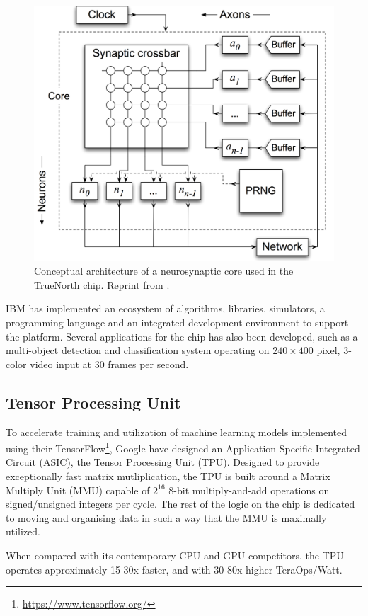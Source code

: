 \begin{figure}[ht]
  \centering
  \includegraphics[width=0.6\linewidth]{fig/truenorth-arch}
  \caption[TrueNorth neurosynaptic core architecture]{Conceptual architecture of a neurosynaptic core used in the TrueNorth
  chip. Reprint from \cite{Preissl2012}.}
  \label{fig:truenorth-arch}
\end{figure}

IBM has implemented an ecosystem of algorithms, libraries, simulators, a
programming language and an integrated development environment to support the
platform. Several applications for the chip has also been developed, such as a
multi-object detection and classification system operating on $240\times400$
pixel, 3-color video input at 30 frames per second.

\subsection{Tensor Processing Unit}

To accelerate training and utilization of machine learning models implemented
using their TensorFlow\footnote{\url{https://www.tensorflow.org/}}, Google have
designed an Application Specific Integrated Circuit (ASIC), the Tensor
Processing Unit (TPU)\cite{Jouppi2017}. Designed to provide exceptionally fast
matrix mutliplication, the TPU is built around a Matrix Multiply Unit (MMU)
capable of $2^{16}$ 8-bit multiply-and-add operations on signed/unsigned
integers per cycle. The rest of the logic on the chip is dedicated to moving and
organising data in such a way that the MMU is maximally utilized.

When compared with its contemporary CPU and GPU competitors, the TPU operates
approximately 15-30x faster, and with 30-80x higher TeraOps/Watt.

